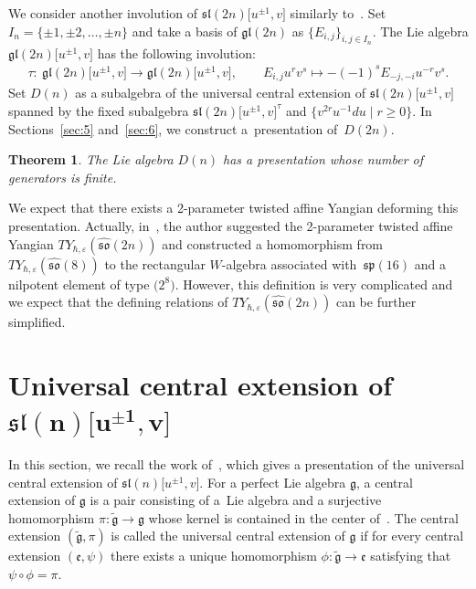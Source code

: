 \documentclass[pdftex]{sigma}
\numberwithin{equation}{section}
\newtheorem{Theorem}{Theorem}[section]
\theoremstyle{definition}
\newcommand{\ve}{\varepsilon}
\begin{document}
We consider another involution of $\mathfrak{sl}(2n)\bigl[u^{\pm1},v\bigr]$ similarly to~\cite{HU}.
Set $I_n=\{\pm1,\pm2,\dots,\pm n\}$ and take a basis of $\mathfrak{gl}(2n)$ as $\{E_{i,j}\}_{i,j\in I_n}$. The Lie algebra $\mathfrak{gl}(2n)\bigl[u^{\pm1},v\bigr]$ has the following involution:
\begin{align*}
\tau\colon\ \mathfrak{gl}(2n)\bigl[u^{\pm1},v\bigr]\to\mathfrak{gl}(2n)\bigl[u^{\pm1},v\bigr],\qquad E_{i,j}u^rv^s\mapsto -(-1)^sE_{-j,-i}u^{-r}v^s.
\end{align*}
Set $D(n)$ as a subalgebra of the universal central extension of $\mathfrak{sl}(2n)\bigl[u^{\pm1},v\bigr]$ spanned by the fixed subalgebra $\mathfrak{sl}(2n)\bigl[u^{\pm1},v\bigr]^\tau$ and $\bigl\{v^{2r}u^{-1}{d}u\mid r\geq0\bigr\}$.
In Sections~\ref{sec:5} and~\ref{sec:6}, we construct a~presentation of~$D(2n)$.
\begin{Theorem}%
The Lie algebra $D(n)$ has a presentation whose number of generators is finite.
\end{Theorem}
We expect that there exists a 2-parameter twisted affine Yangian deforming this presentation. Actually, in~\cite{U78}, the author suggested the 2-parameter twisted affine Yangian $TY_{\hbar,\ve}(\widehat{\mathfrak{so}}(2n))$ and constructed a homomorphism from $TY_{\hbar,\ve}(\widehat{\mathfrak{so}}(8))$ to the rectangular $W$-algebra associated with~$\mathfrak{sp}(16)$ and a nilpotent element of type $\bigl(2^8\bigr)$. However, this definition is very complicated and we expect that the defining relations of $TY_{\hbar,\ve}(\widehat{\mathfrak{so}}(2n))$ can be further simplified.


\section[Universal central extension of sl(n){[u\^{}\{pm1\},v]}]{Universal central extension of $\boldsymbol{\mathfrak{sl}(n)\bigl[u^{\pm1},v\bigr]}$}
In this section, we recall the work of~\cite{MRY}, which gives a presentation of the universal central extension of $\mathfrak{sl}(n)\bigl[u^{\pm1},v\bigr]$. For a perfect Lie algebra $\mathfrak{g}$, a central extension of $\mathfrak{g}$ is a pair consisting of a~Lie algebra  and a surjective homomorphism $\pi\colon\widetilde{\mathfrak{g}}\to\mathfrak{g}$ whose kernel is contained in the center of~. The central extension $(\widetilde{\mathfrak{g}},\pi)$ is called the universal central extension of $\mathfrak{g}$ if for every central extension $(\mathfrak{e},\psi)$ there exists a unique homomorphism $\phi\colon\widetilde{\mathfrak{g}}\to\mathfrak{e}$ satisfying that $\psi\circ\phi=\pi$.
\end{document}

